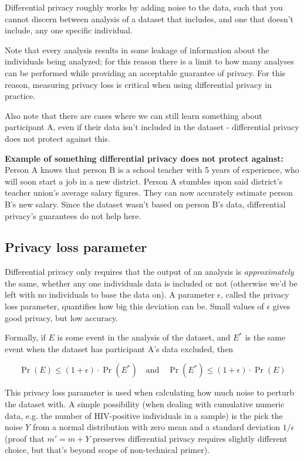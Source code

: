 \documentclass[a4paper]{article}
\begin{document}
Differential privacy roughly works by adding noise to the data, such that you cannot discern between analysis of a dataset that includes, and one that doesn't include, any one specific individual.

Note that every analysis results in some leakage of information about the individuals being analyzed; for this reason there is a limit to how many analyses can be performed while providing an acceptable guarantee of privacy. For this reason, measuring privacy loss is critical when using differential privacy in practice.

Also note that there are cases where we can still learn something about participant A, even if their data isn't included in the dataset - differential privacy does not protect against this.

\begin{mdframed}
\textbf{Example of something differential privacy does not protect against:}\\
Person A knows that person B is a school teacher with 5 years of experience, who will soon start a job in a new district. Person A stumbles upon said district's teacher union's average salary figures. They can now accurately estimate person B's new salary. Since the dataset wasn't based on person B's data, differential privacy's guarantees do not help here.
\end{mdframed}

\subsection{Privacy loss parameter}

Differential privacy only requires that the output of an analysis is \textit{approximately} the same, whether any one individuals data is included or not (otherwise we'd be left with no individuals to base the data on). A parameter $\epsilon$, called the privacy loss parameter, quantifies how big this deviation can be. Small values of $\epsilon$ gives good privacy, but low accuracy.

Formally, if $E$ is some event in the analysis of the dataset, and $E^*$ is the same event when the dataset has participant A's data excluded, then

$$\Pr(E) \leq (1 + \epsilon) \cdot \Pr(E^*) \quad \text{and} \quad \Pr(E^*) \leq (1 + \epsilon) \cdot \Pr(E)$$

This privacy loss parameter is used when calculating how much noise to perturb the dataset with. A simple possibility (when dealing with cumulative numeric data, e.g. the number of HIV-positive individuals in a sample) is the pick the noise $Y$ from a normal distribution with zero mean and a standard deviation $1/\epsilon$ (proof that $m' = m+Y$ preserves differential privacy requires slightly different choice, but that's beyond scope of non-technical primer).
\end{document}
